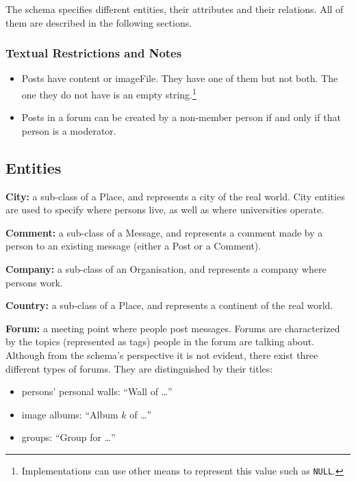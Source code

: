 The schema specifies different entities, their attributes and their relations.
All of them are described in the following sections.

\subsubsection*{Textual Restrictions and Notes}
\begin{itemize}
    \item Posts have content or imageFile. They have one of them but not both. The one they do not have is an empty string.\footnote{Implementations can use other means to represent this value such as \texttt{NULL}.}
    \item Posts in a forum can be created by a non-member person if and only if that person is a moderator.
\end{itemize}

\subsection{Entities}

{\flushleft \textbf{City:}} a sub-class of a Place, and represents a
city of the real world. City entities are used to specify where persons live,
as well as where universities operate.

{\flushleft \textbf{Comment:}} a sub-class of a Message, and represents a
comment made by a person to an existing message (either a Post or a Comment).

{\flushleft \textbf{Company:}} a sub-class of an Organisation, and represents a company where persons work.


{\flushleft \textbf{Country:}} a sub-class of a Place, and represents a continent of the real world.


{\flushleft \textbf{Forum:}} a meeting point where people
post messages. Forums are characterized by the topics (represented as tags)
people in the forum are talking about. Although from the schema's perspective
it is not evident, there exist three different types of
forums.  They are distinguished by their titles:

\begin{itemize}
    \item persons' personal walls: ``Wall of \ldots''
    \item image albums: ``Album $k$ of \ldots''
    \item groups: ``Group for \ldots''
\end{itemize}

